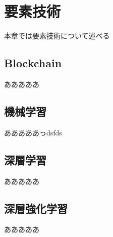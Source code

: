 \chapter{要素技術}
\label{technical_background}

本章では要素技術について述べる

\section{Blockchain}

あああああ

\section{機械学習}

あああああっdsfds

\section{深層学習}

あああああ

\section{深層強化学習}

あああああ

\section{}




